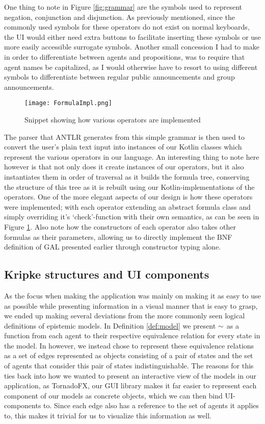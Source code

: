 One thing to note in Figure \ref{fig:grammar} are the symbols used to represent negation, conjunction and disjunction. As previously mentioned, since the commonly used symbols for these operators do not exist on normal keyboards, the UI would either need extra buttons to facilitate inserting these symbols or use more easily accessible surrogate symbols. Another small concession I had to make in order to differentiate between agents and propositions, was to require that agent names be capitalized, as I would otherwise have to resort to using different symbols to differentiate between regular public announcements and group announcements. 

\begin{figure}[h]
	\texttt{[image: FormulaImpl.png]}
	\caption{Snippet showing how various operators are implemented}
	\label{fig:formulaImpl}
\end{figure}

The parser that ANTLR generates from this simple grammar is then used to convert the user's plain text input into instances of our Kotlin classes which represent the various operators in our language. An interesting thing to note here however is that not only does it create instances of our operators, but it also instantiates them in order of traversal as it builds the formula tree, conserving the structure of this tree as it is rebuilt using our Kotlin-implementations of the operators. One of the more elegant aspects of our design is how these operators were implemented; with each operator extending an abstract formula class and simply overriding it's `check'-function with their own semantics, as can be seen in Figure \ref{fig:formulaImpl}. Also note how the constructors of each operator also takes other formulas as their parameters, allowing us to directly implement the BNF definition of GAL presented earlier through constructor typing alone.

\subsection{Kripke structures and UI components}

As the focus when making the application was mainly on making it as easy to use as possible while presenting information in a visual manner that is easy to grasp, we ended up making several deviations from the more commonly seen logical definitions of epistemic models. In Definition \ref{def:model} we present $\sim$ as a function from each agent to their respective equivalence relation for every state in the model. In \cname{} however, we instead chose to represent these equivalence relations as a set of edges represented as objects consisting of a pair of states and the set of agents that consider this pair of states indistinguishable. The reasons for this ties back into how we wanted to present an interactive view of the models in our application, as TornadoFX, our GUI library makes it far easier to represent each component of our models as concrete objects, which we can then bind UI-components to. Since each edge also has a reference to the set of agents it applies to, this makes it trivial for us to visualize this information as well. 

